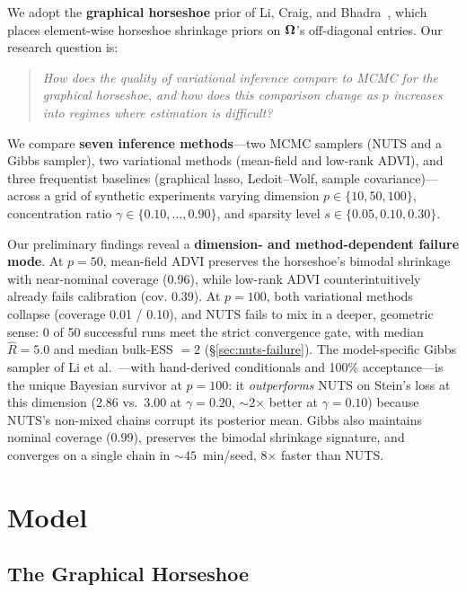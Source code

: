 \documentclass[10pt,conference,compsoc]{IEEEtran}
\begin{document}
We adopt the \textbf{graphical horseshoe} prior of Li, Craig, and Bhadra~\cite{li2019}, which places element-wise horseshoe shrinkage priors on $\bm{\Omega}$'s off-diagonal entries. Our research question is:
\begin{quote}
\textit{How does the quality of variational inference compare to MCMC for the graphical horseshoe, and how does this comparison change as $p$ increases into regimes where estimation is difficult?}
\end{quote}

We compare \textbf{seven inference methods}---two MCMC samplers (NUTS and a Gibbs sampler), two variational methods (mean-field and low-rank ADVI), and three frequentist baselines (graphical lasso, Ledoit--Wolf, sample covariance)---across a grid of synthetic experiments varying dimension $p \in \{10, 50, 100\}$, concentration ratio $\gamma \in \{0.10, \ldots, 0.90\}$, and sparsity level $s \in \{0.05, 0.10, 0.30\}$.

Our preliminary findings reveal a \textbf{dimension- and method-dependent failure mode}. At $p{=}50$, mean-field ADVI preserves the horseshoe's bimodal shrinkage with near-nominal coverage (0.96), while low-rank ADVI counterintuitively already fails calibration (cov. 0.39). At $p{=}100$, both variational methods collapse (coverage 0.01 / 0.10), and NUTS fails to mix in a deeper, geometric sense: 0 of 50 successful runs meet the strict convergence gate, with median $\hat{R} = 5.0$ and median bulk-ESS $= 2$ (\S\ref{sec:nuts-failure}). The model-specific Gibbs sampler of Li et al.~\cite{li2019}---with hand-derived conditionals and 100\% acceptance---is the unique Bayesian survivor at $p{=}100$: it \emph{outperforms} NUTS on Stein's loss at this dimension (2.86 vs.\ 3.00 at $\gamma{=}0.20$, $\sim$2$\times$ better at $\gamma{=}0.10$) because NUTS's non-mixed chains corrupt its posterior mean. Gibbs also maintains nominal coverage (0.99), preserves the bimodal shrinkage signature, and converges on a single chain in ${\sim}45$~min/seed, 8$\times$ faster than NUTS.

\section{Model}

\subsection{The Graphical Horseshoe}
\end{document}
